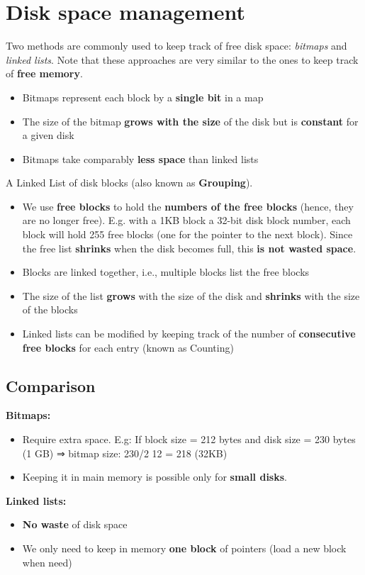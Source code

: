 \documentclass{article}
\begin{document}
\section{Disk space management}
\begin{flushleft}
Two methods are commonly used to keep track of free disk space: \textit{bitmaps} and \textit{linked lists}. Note that these approaches are very similar to the ones to keep track of \textbf{free memory}.
\begin{itemize}
	\item Bitmaps represent each block by a \textbf{single bit} in a map 
	\item The size of the bitmap \textbf{grows with the size} of the disk but is \textbf{constant} for a given disk
	\item Bitmaps take comparably \textbf{less space} than linked lists
\end{itemize}
A Linked List of disk blocks (also known as \textbf{Grouping}).
\begin{itemize}
	\item We use \textbf{free blocks} to hold the \textbf{numbers of the free blocks} (hence, they are no longer free). E.g. with a 1KB block a 32-bit disk block number, each block will hold 255 free blocks (one for the pointer to the next block). Since the free list \textbf{shrinks} when the disk becomes full, this \textbf{is not wasted space}.
	\item Blocks are linked together, i.e., multiple blocks list the free blocks
	\item The size of the list \textbf{grows} with the size of the disk and \textbf{shrinks} with the size of the blocks
	\item Linked lists can be modified by keeping track of the number of \textbf{consecutive free blocks} for each entry (known as Counting)
\end{itemize}
\end{flushleft}

\subsection{Comparison}
\begin{flushleft}
\textbf{Bitmaps:}
\begin{itemize}
	\item  Require extra space. E.g: If block size = 212 bytes and disk size = 230 bytes (1 GB) ⇒ bitmap size: 230/2 12 = 218 (32KB)
	\item Keeping it in main memory is possible only for \textbf{small disks}. 
\end{itemize}
\textbf{Linked lists:}
\begin{itemize}
	\item \textbf{No waste} of disk space
	\item We only need to keep in memory \textbf{one block} of pointers (load a new block when need)
\end{itemize}
\end{flushleft}
\end{document}

